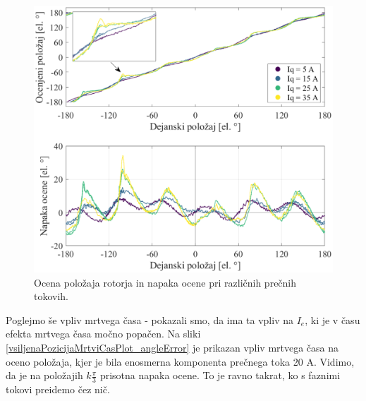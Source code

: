 \documentclass[a4paper,twoside,openright,12pt,slovene]{book}
\begin{document}
\begin{figure}[!htbp]
    \centering
    \includegraphics[width=1.05\columnwidth]{Slike/vsiljenaPozicijaTokovi_angleError.eps}
    \caption{\label{vsiljenaPozicijaTokovi_angleError} Ocena položaja rotorja in napaka ocene pri različnih prečnih tokovih. }
\end{figure}

\newpage
Poglejmo še vpliv mrtvega časa - pokazali smo, da ima ta vpliv na $I_e$, ki je v času efekta mrtvega časa močno popačen. Na sliki \ref{vsiljenaPozicijaMrtviCasPlot_angleError} je prikazan vpliv
mrtvega časa na oceno položaja, kjer je bila enosmerna komponenta prečnega toka 20 A. Vidimo, da je na položajih $k\frac{\pi}{3}$ prisotna napaka ocene. To je ravno takrat, ko s faznimi tokovi
preidemo čez nič.
\end{document}
